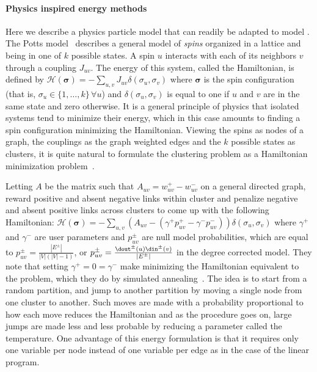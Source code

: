 \paragraph{Physics inspired energy methods}
\label{par:cc_physics}

Here we describe a physics particle model that can readily be adapted to model \pcc{}.
The Potts model~\autocite{PottsSurvey82} describes a general model of \emph{spins} organized in a
lattice and being in one of $k$ possible states. A spin $u$ interacts with each of its neighbors $v$
through a coupling $J_{uv}$. The energy of this system, called the Hamiltonian, is defined by
$\mathcal{H}(\bm{\sigma}) = -\sum_{u,v} J_{uv} \delta(\sigma_u, \sigma_v)$ where $\bm{\sigma}$ is
the spin configuration (that is, $\sigma_u \in \{1,\ldots,k\}\,\forall u$) and $\delta(\sigma_u,
\sigma_v)$ is equal to one if $u$ and $v$ are in the same state and zero otherwise. It is a general
principle of physics that isolated systems tend to minimize their energy, which in this case amounts
to finding a spin configuration minimizing the Hamiltonian. Viewing the spins as nodes of a graph,
the couplings as the graph weighted edges and the $k$ possible states as clusters, it is quite
natural to formulate the clustering problem as a Hamiltonian minimization
problem~\autocite{CommunityPhysics06}.

Letting $A$ be the matrix such that $A_{uv} = w_{uv}^+ -
w_{uv}^-$ on a general directed graph, \textcite{Traag2009} reward positive and absent negative
links within cluster and penalize negative and absent positive links across clusters to come up with
the following Hamiltonian: $\mathcal{H}(\bm{\sigma}) = -\sum_{u,v} \left(A_{uv}-(\gamma^+p^+_{uv} -
\gamma^-p^-_{uv})\right) \delta(\sigma_u, \sigma_v)$ where $\gamma^+$ and $\gamma^-$ are user
parameters and $p^\pm_{uv}$ are null model probabilities, which are equal to $p^\pm_{uv} =
\frac{|E^\pm|}{|V|(|V|-1)}$, or $p^\pm_{uv}=\frac{\dout^\pm(u) \din^\pm(v)}{|E^\pm|}$ in the degree
corrected model. They note that setting $\gamma^+ = 0 = \gamma^-$ make minimizing the Hamiltonian
equivalent to the \mind{} problem, which they do by simulated
annealing~\autocite{SimulatedAnnealing83}. The idea is to start from a random partition, and jump to
another partition by moving a single node from one cluster to another. Such moves are made with a
probability proportional to how each move reduces the Hamiltonian and as the procedure goes on, large
jumps are made less and less probable by reducing a parameter called the temperature.
One advantage of this energy formulation is that it requires only one variable per node instead of
one variable per edge as in the case of the linear program.

